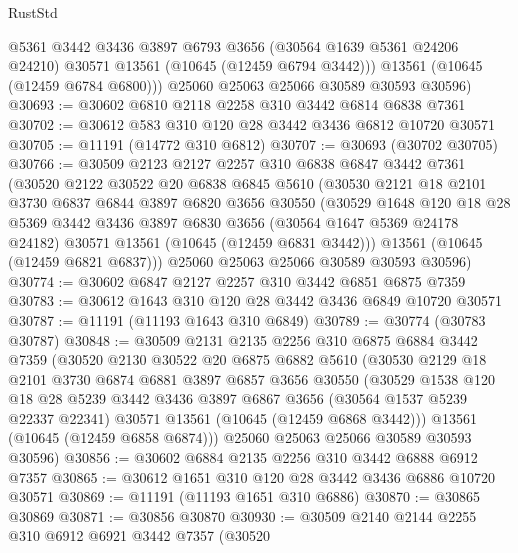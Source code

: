 \begin{lexlean}{RustStd}
\begin{coremodule}
          @5361
          @3442
          @3436
          @3897
          @6793
          @3656
          (@30564 @1639 @5361 @24206 @24210)
          @30571
          @13561
          (@10645 (@12459 @6794 @3442)))
        @13561
        (@10645 (@12459 @6784 @6800)))
      @25060
      @25063
      @25066
      @30589
      @30593
      @30596)
@30693 := @30602 @6810 @2118 @2258 @310 @3442 @6814 @6838 @7361
@30702 := @30612 @583 @310 @120 @28 @3442 @3436 @6812 @10720 @30571
@30705 := @11191 (@14772 @310 @6812)
@30707 := @30693 (@30702 @30705)
@30766 := @30509
    @2123
    @2127
    @2257
    @310
    @6838
    @6847
    @3442
    @7361
    (@30520
      @2122
      @30522
      @20
      @6838
      @6845
      @5610
      (@30530
        @2121
        @18
        @2101
        @3730
        @6837
        @6844
        @3897
        @6820
        @3656
        @30550
        (@30529
          @1648
          @120
          @18
          @28
          @5369
          @3442
          @3436
          @3897
          @6830
          @3656
          (@30564 @1647 @5369 @24178 @24182)
          @30571
          @13561
          (@10645 (@12459 @6831 @3442)))
        @13561
        (@10645 (@12459 @6821 @6837)))
      @25060
      @25063
      @25066
      @30589
      @30593
      @30596)
@30774 := @30602 @6847 @2127 @2257 @310 @3442 @6851 @6875 @7359
@30783 := @30612 @1643 @310 @120 @28 @3442 @3436 @6849 @10720 @30571
@30787 := @11191 (@11193 @1643 @310 @6849)
@30789 := @30774 (@30783 @30787)
@30848 := @30509
    @2131
    @2135
    @2256
    @310
    @6875
    @6884
    @3442
    @7359
    (@30520
      @2130
      @30522
      @20
      @6875
      @6882
      @5610
      (@30530
        @2129
        @18
        @2101
        @3730
        @6874
        @6881
        @3897
        @6857
        @3656
        @30550
        (@30529
          @1538
          @120
          @18
          @28
          @5239
          @3442
          @3436
          @3897
          @6867
          @3656
          (@30564 @1537 @5239 @22337 @22341)
          @30571
          @13561
          (@10645 (@12459 @6868 @3442)))
        @13561
        (@10645 (@12459 @6858 @6874)))
      @25060
      @25063
      @25066
      @30589
      @30593
      @30596)
@30856 := @30602 @6884 @2135 @2256 @310 @3442 @6888 @6912 @7357
@30865 := @30612 @1651 @310 @120 @28 @3442 @3436 @6886 @10720 @30571
@30869 := @11191 (@11193 @1651 @310 @6886)
@30870 := @30865 @30869
@30871 := @30856 @30870
@30930 := @30509
    @2140
    @2144
    @2255
    @310
    @6912
    @6921
    @3442
    @7357
    (@30520

\end{coremodule}
\end{lexlean}
